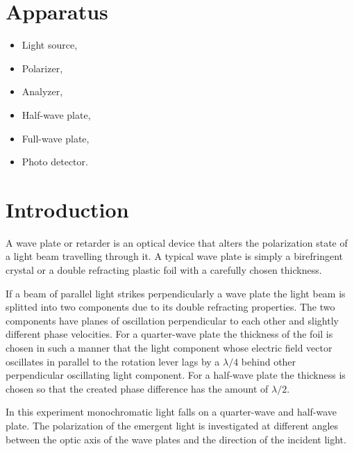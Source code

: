 \documentclass{article}
\begin{document}
\section{Apparatus}
\begin{itemize}
    \item Light source,
    \item Polarizer,
    \item Analyzer,
    \item Half-wave plate,
    \item Full-wave plate,
    \item Photo detector.
\end{itemize}

\section{Introduction}
\noindent
A wave plate or retarder is an optical device that alters the
polarization state of a light beam travelling through it. A typical wave plate is simply a birefringent crystal or a double
refracting plastic foil with a carefully chosen thickness. 
\par
\noindent
If a beam of parallel light strikes perpendicularly a wave plate
the light beam is splitted into two components due to its double refracting properties. The two components have planes of
oscillation perpendicular to each other and slightly different
phase velocities. For a quarter-wave plate the thickness of
the foil is chosen in such a manner that the light component
whose electric field vector oscillates in parallel to the rotation
lever lags by a $\lambda /4$ behind other perpendicular oscillating light
component. For a half-wave plate the thickness is chosen so
that the created phase difference has the amount of $\lambda /2$.
\par
\noindent
In this experiment monochromatic light falls on a quarter-wave and half-wave plate. The polarization of the emergent
light is investigated at different angles between the optic axis
of the wave plates and the direction of the incident light. 
\end{document}
